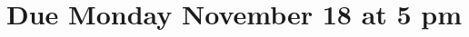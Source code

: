 \documentclass[11pt,fleqn]{article}
\begin{document}
\maketitle
\section*{Due Monday November 18 at 5 pm}










\end{document}
